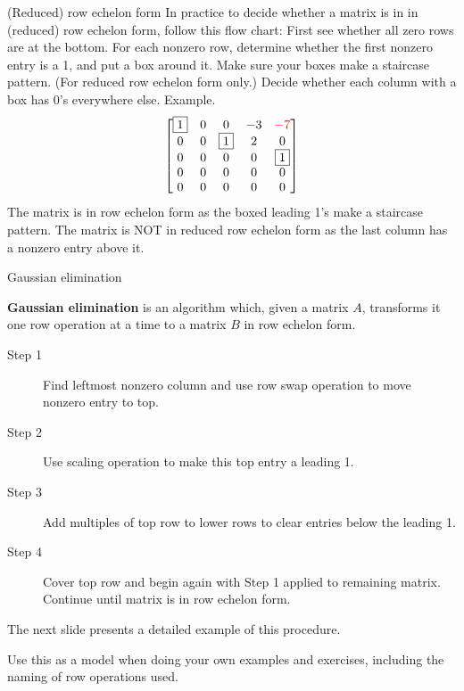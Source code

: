 \begin{frame}{(Reduced) row echelon form}\footnotesize
In practice to decide whether a matrix is in in (reduced) row echelon form, follow this flow chart:
\bb
\ii First see whether all zero rows are at the bottom. 
\ii For each nonzero row, determine whether the first nonzero entry is a 1, and put a box around it. 
\ii Make sure your boxes make a staircase pattern.  
\ii (For reduced row echelon form only.) Decide whether each column with a box has 0's everywhere else. 
\ee
\pause
\alert{Example.}
\[
\begin{bmatrix}
\boxed{1}&0&0&-3&{\color{red}-7}\\
0&0&\boxed{1}&2&0\\
0&0&0&0&\boxed{1}\\
0&0&0&0&0\\
0&0&0&0&0
\end{bmatrix}
\]
\pause
The matrix is in row echelon form as the boxed leading 1's make a staircase pattern. 
\bpause
The matrix is NOT in reduced row echelon form as the last column has a nonzero entry above it. \end{frame}
\begin{frame}{Gaussian elimination}

{\bf Gaussian elimination} is an algorithm which, given a matrix $A$, transforms it one row operation at a time to a matrix $B$ in row echelon form.  
\begin{description}
\item[Step 1]Find leftmost nonzero column and use row swap operation to move nonzero entry to top.
\item[Step 2] Use scaling operation to make this top entry a leading 1.
\item[Step 3] Add multiples of top row to lower rows to clear entries below the leading 1. 
\item[Step 4] Cover top row and begin again with Step 1 applied to remaining matrix. Continue until matrix is in row echelon form. 
\end{description}
\pause The next slide presents a detailed example of this procedure. 

\alert{Use this as a model when doing your own examples and exercises, including the naming of row operations used}.  
\end{frame}
